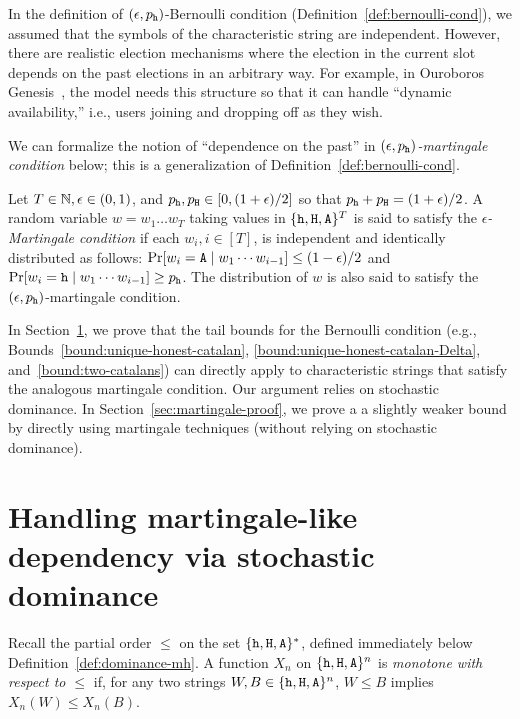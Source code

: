 In the definition of $(\epsilon, p_{\mathtt{h}})$-Bernoulli condition (Definition~\ref{def:bernoulli-cond}), 
we assumed that the symbols of the characteristic string are independent. 
However, there are realistic election mechanisms where 
the election in the current slot depends on the past elections in an arbitrary way. 
For example, in Ouroboros Genesis~\cite{Genesis}, the model needs this structure 
so that it can handle ``dynamic availability,'' i.e., users joining and dropping off as they wish.

We can formalize the notion of ``dependence on the past'' 
in \emph{$(\epsilon, p_{\mathtt{h}})$-martingale condition} below;
this is a generalization of Definition~\ref{def:bernoulli-cond}. 


\begin{definition}\label{def:martingale-cond}
  Let $T \in \mathbb{N}, \epsilon \in (0,1)$, and $p_{\mathtt{h}}, p_{\mathtt{H}} \in  [0, (1+\epsilon)/2]$ so that 
  $p_{\mathtt{h}} + p_{\mathtt{H}} = (1+\epsilon)/2$. A random variable $w = w_1 \ldots w_T$
  taking values in $\{\mathtt{h}, \mathtt{H}, \mathtt{A}\}^T$ is said to satisfy the
  \emph{$\epsilon$-Martingale condition} if each
  $w_i, i \in [T]$, is independent and identically distributed as
  follows: 
  $\Pr[w_i = \mathtt{A} \mid w_1 \cdots w_{i-1}] \leq (1-\epsilon)/2$ and 
  $\Pr[w_i = \mathtt{h} \mid w_1 \cdots w_{i-1}] \geq p_{\mathtt{h}}$.
  The distribution of $w$ is also said
  to satisfy the $(\epsilon, p_{\mathtt{h}})$-martingale condition.
\end{definition}


In Section~\ref{sec:martingale-dominance}, we prove that the tail bounds 
for the Bernoulli condition 
(e.g., Bounds~\ref{bound:unique-honest-catalan},
\ref{bound:unique-honest-catalan-Delta}, 
and~\ref{bound:two-catalans})
can directly apply to characteristic strings that satisfy the analogous martingale condition. 
Our argument relies on stochastic dominance.
In Section~\ref{sec:martingale-proof}, 
we prove a a slightly weaker bound 
by directly using martingale techniques (without relying on stochastic dominance). 



\section{Handling martingale-like dependency via stochastic dominance}\label{sec:martingale-dominance}


  
  Recall the partial order $\leq$ on the set $\{\mathtt{h}, \mathtt{H}, \mathtt{A}\}^*$, 
  defined immediately below Definition~\ref{def:dominance-mh}.
  A function $X_n$ on $\{\mathtt{h}, \mathtt{H}, \mathtt{A}\}^n$ is \emph{monotone with respect to $\leq$} 
  if, for any two strings $W, B \in \{\mathtt{h}, \mathtt{H}, \mathtt{A}\}^n$, $W \leq B$ implies $X_n(W) \leq X_n(B)$. 

